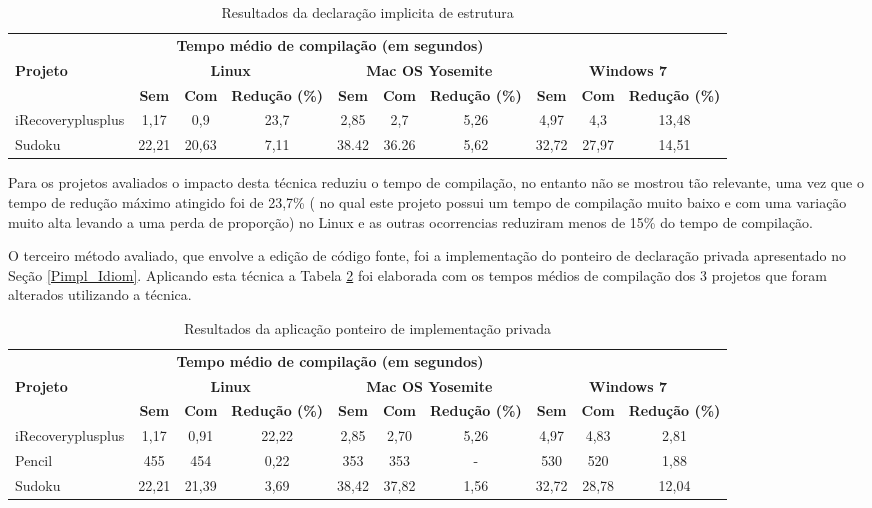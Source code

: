 \begin{table}[!ht]
\tiny
\centering
\caption{Resultados da declaração implicita de estrutura}
\label{tab:forward_declaration}
\begin{tabular}{lccccccccc}
& \multicolumn{6}{c}{\textbf{Tempo médio de compilação (em segundos)} } \\
\textbf{Projeto} & \multicolumn{3}{c}{\textbf{Linux}} & \multicolumn{3}{c}{\textbf{Mac OS Yosemite}} & \multicolumn{3}{c}{\textbf{Windows 7}} \\ 
& \textbf{Sem } & \textbf{Com }  & \textbf{Redução (\%)} & \textbf{Sem } & \textbf{Com }  & \textbf{Redução (\%)} & \textbf{Sem } & \textbf{Com }  & \textbf{Redução (\%)} \\
\toprule
iRecoveryplusplus &  1,17  &   0,9   & 23,7  &   2,85  &  2,7   & 5,26 &  4,97 & 4,3   & 13,48 \\
Sudoku            & 22,21  & 20,63   & 7,11  &  38.42  & 36.26  & 5,62  & 32,72 & 27,97 & 14,51  \\ 
\end{tabular}
\end{table}

Para os projetos avaliados o impacto desta técnica reduziu o tempo de compilação, no entanto não se mostrou tão relevante, uma vez que o tempo de redução máximo atingido foi de 23,7\% ( no qual este projeto possui um tempo de compilação muito baixo e com uma variação muito alta levando a uma perda de proporção) no Linux e as outras ocorrencias reduziram menos de 15\% do tempo de compilação. 

O terceiro método avaliado, que envolve a edição de código fonte, foi a implementação do ponteiro de declaração privada apresentado no Seção \ref{Pimpl_Idiom}. Aplicando esta técnica a Tabela \ref{tab:pimpl} foi elaborada com os tempos médios de compilação dos 3 projetos que foram alterados utilizando a técnica.

\begin{table}[!ht]
\tiny
\centering
\caption{Resultados da aplicação ponteiro de implementação privada }
\label{tab:pimpl}
\begin{tabular}{lccccccccc}
& \multicolumn{6}{c}{\textbf{Tempo médio de compilação (em segundos)} } \\
\textbf{Projeto} & \multicolumn{3}{c}{\textbf{Linux}} & \multicolumn{3}{c}{\textbf{Mac OS Yosemite}} & \multicolumn{3}{c}{\textbf{Windows 7}} \\ 
& \textbf{Sem } & \textbf{Com }  & \textbf{Redução (\%)} & \textbf{Sem } & \textbf{Com }  & \textbf{Redução (\%)} & \textbf{Sem } & \textbf{Com }  & \textbf{Redução (\%)} \\
\toprule
iRecoveryplusplus  &   1,17   &  0,91   & 22,22   & 2,85  & 2,70   & 5,26  & 4,97 & 4,83 & 2,81 \\ 
Pencil             &   455    &  454    & 0,22    & 353   & 353    & -     & 530 & 520   & 1,88 \\
Sudoku             &   22,21  & 21,39   & 3,69    & 38,42 & 37,82  & 1,56  & 32,72 & 28,78 & 12,04 \\ 
\end{tabular}
\end{table}

